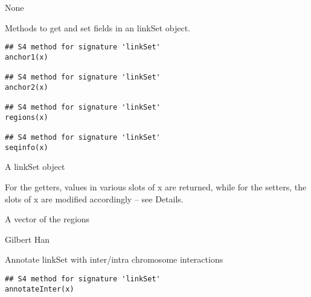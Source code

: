 \documentclass[letterpaper]{book}
\begin{document}
%
\begin{Value}
None
\end{Value}
%
\begin{Description}
Methods to get and set fields in an linkSet object.
\end{Description}
%
\begin{Usage}
\begin{verbatim}
## S4 method for signature 'linkSet'
anchor1(x)

## S4 method for signature 'linkSet'
anchor2(x)

## S4 method for signature 'linkSet'
regions(x)

## S4 method for signature 'linkSet'
seqinfo(x)
\end{verbatim}
\end{Usage}
%
\begin{Arguments}
\begin{ldescription}
\item[\code{x}] A linkSet object
\end{ldescription}
\end{Arguments}
%
\begin{Value}
For the getters, values in various slots of x are returned,
while for the setters, the slots of x are modified accordingly – see Details.

A vector of the regions
\end{Value}
%
\begin{Author}
Gilbert Han
\end{Author}
%
\begin{Description}
Annotate linkSet with inter/intra chromosome interactions
\end{Description}
%
\begin{Usage}
\begin{verbatim}
## S4 method for signature 'linkSet'
annotateInter(x)
\end{verbatim}
\end{Usage}
\end{document}
